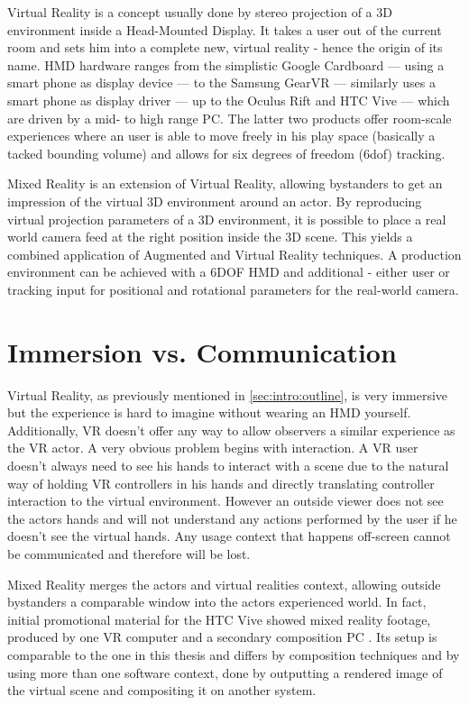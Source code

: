 Virtual Reality is a concept usually done by stereo projection of a 3D 
environment inside a Head-Mounted Display. It takes a user out of the current 
room and sets him into a complete new, virtual reality - hence the origin of 
its name. HMD hardware ranges from the simplistic Google Cardboard --- using a 
smart phone as display device --- to the Samsung GearVR --- similarly uses a 
smart phone as display driver --- up to the Oculus Rift and HTC Vive --- which 
are driven by a mid- to high range PC. The latter two products offer room-scale 
experiences where an user is able to move freely in his play space (basically a 
tacked bounding volume) and allows for six degrees of freedom (\gls{6dof}) 
tracking.

Mixed Reality is an extension of Virtual Reality, allowing bystanders to get an 
impression of the virtual 3D environment around an actor. By reproducing 
virtual projection parameters of a 3D environment, it is possible to place a 
real world camera feed at the right position inside the 3D scene. This 
yields a combined application of Augmented and Virtual Reality techniques. A 
production environment can be achieved with a \gls{6DOF} HMD and additional - 
either user or tracking input for positional and rotational parameters for the 
real-world camera. 

\section{Immersion vs. Communication}

Virtual Reality, as previously mentioned in \ref{sec:intro:outline}, is very 
immersive but the experience is hard to imagine without wearing an HMD 
yourself. Additionally, VR doesn't offer any way to allow observers a similar 
experience as the VR actor.
\newline
A very obvious problem begins with interaction. A VR user doesn't always need 
to see his hands to interact with a scene due to the natural way of holding VR 
controllers in his hands and directly translating controller interaction to the
virtual environment. However an outside viewer does not see the actors hands 
and will not understand any actions performed by the user if he doesn't see the 
virtual hands. Any usage context that happens off-screen cannot be communicated 
and therefore will be lost.

Mixed Reality merges the actors and virtual realities context, allowing outside 
bystanders a comparable window into the actors experienced world. In fact, 
initial promotional material for the HTC Vive showed mixed reality footage, 
produced by one VR computer and a secondary composition PC 
\cite{valve:mr-production:2016}. Its setup is comparable to the one in this 
thesis and differs by composition techniques and by using more than one 
software context, done by outputting a rendered image of the virtual scene and 
compositing it on another system.

